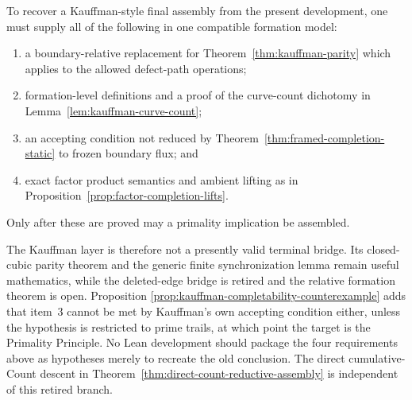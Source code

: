 \begin{proposition}
\label{thm:kauffman-source-assembly}
\Sopen
To recover a Kauffman-style final assembly from the present development, one
must supply all of the following in one compatible formation model:
\begin{enumerate}
  \item a boundary-relative replacement for
        Theorem~\ref{thm:kauffman-parity} which applies to the allowed
        defect-path operations;
  \item formation-level definitions and a proof of the curve-count
        dichotomy in Lemma~\ref{lem:kauffman-curve-count};
  \item an accepting condition not reduced by
        Theorem~\ref{thm:framed-completion-static} to frozen boundary flux;
        and
  \item exact factor product semantics and ambient lifting as in
        Proposition~\ref{prop:factor-completion-lifts}.
\end{enumerate}
Only after these are proved may a primality implication be assembled.
\end{proposition}

The Kauffman layer is therefore not a presently valid terminal bridge.
Its closed-cubic parity theorem and the generic finite synchronization lemma
remain useful mathematics, while the deleted-edge bridge is retired and the
relative formation theorem is open.  Proposition
\ref{prop:kauffman-completability-counterexample} adds that item~3 cannot be
met by Kauffman's own accepting condition either, unless the hypothesis is
restricted to prime trails, at which point the target is the Primality
Principle.  No Lean development should package the
four requirements above as hypotheses merely to recreate the old conclusion.
The direct cumulative-Count descent in
Theorem~\ref{thm:direct-count-reductive-assembly} is independent of this
retired branch.
